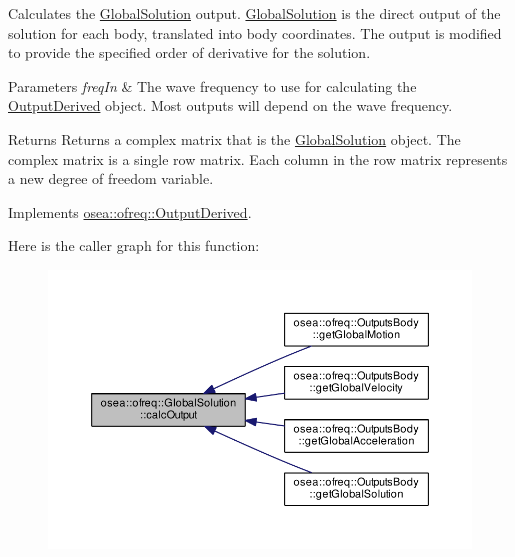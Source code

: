 Calculates the \hyperlink{classosea_1_1ofreq_1_1_global_solution}{Global\-Solution} output. \hyperlink{classosea_1_1ofreq_1_1_global_solution}{Global\-Solution} is the direct output of the solution for each body, translated into body coordinates. The output is modified to provide the specified order of derivative for the solution. 


\begin{DoxyParams}{Parameters}
{\em freq\-In} & The wave frequency to use for calculating the \hyperlink{classosea_1_1ofreq_1_1_output_derived}{Output\-Derived} object. Most outputs will depend on the wave frequency. \\
\hline
\end{DoxyParams}
\begin{DoxyReturn}{Returns}
Returns a complex matrix that is the \hyperlink{classosea_1_1ofreq_1_1_global_solution}{Global\-Solution} object. The complex matrix is a single row matrix. Each column in the row matrix represents a new degree of freedom variable. 
\end{DoxyReturn}


Implements \hyperlink{classosea_1_1ofreq_1_1_output_derived_a5600a2c7f70052a8bafce79e15e1aa92}{osea\-::ofreq\-::\-Output\-Derived}.



Here is the caller graph for this function\-:
\nopagebreak
\begin{figure}[H]
\begin{center}
\leavevmode
\includegraphics[width=350pt]{classosea_1_1ofreq_1_1_global_solution_adf90922a97153ce858da530e20bc3f4d_icgraph}
\end{center}
\end{figure}


